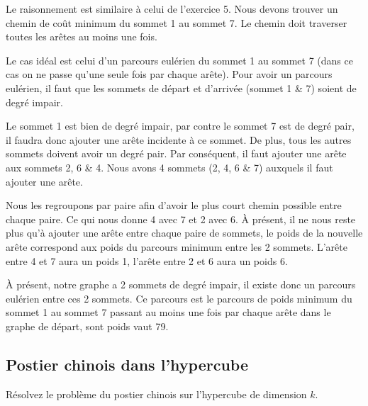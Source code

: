 \begin{solution}
Le raisonnement est similaire à celui de l'exercice 5. Nous devons
trouver un chemin de coût minimum du sommet 1 au sommet 7. Le chemin
doit traverser toutes les arêtes au moins une fois. 

Le cas idéal est celui d'un parcours eulérien du sommet 1 au sommet 7 (dans ce cas
on ne passe qu'une seule fois par chaque arête). Pour avoir un parcours
eulérien, il faut que les sommets de départ et d'arrivée (sommet 1
\& 7) soient de degré impair. 

Le sommet 1 est bien de degré impair,
par contre le sommet 7 est de degré pair, il faudra donc ajouter une
arête incidente à ce sommet. De plus, tous les autres sommets doivent
avoir un degré pair. Par conséquent, il faut ajouter une arête aux
sommets 2, 6 \& 4. Nous avons 4 sommets (2, 4, 6 \& 7) auxquels il faut
ajouter une arête. 

Nous les regroupons par paire afin d'avoir le plus
court chemin possible entre chaque paire. Ce qui nous donne 4 avec
7 et 2 avec 6. À présent, il ne nous reste plus qu'à ajouter une arête
entre chaque paire de sommets, le poids de la nouvelle arête correspond
aux poids du parcours minimum entre les 2 sommets. L'arête entre 4
et 7 aura un poids 1, l'arête entre 2 et 6 aura un poids 6. 

À présent, notre graphe a 2 sommets de degré impair, il existe donc un parcours
eulérien entre ces 2 sommets. Ce parcours est le parcours de poids
minimum du sommet 1 au sommet 7 passant au moins une fois par chaque
arête dans le graphe de départ, sont poids vaut 79.
\end{solution}

\subsection{Postier chinois dans l'hypercube} Résolvez le problème du postier chinois sur l'hypercube de dimension $k$.
